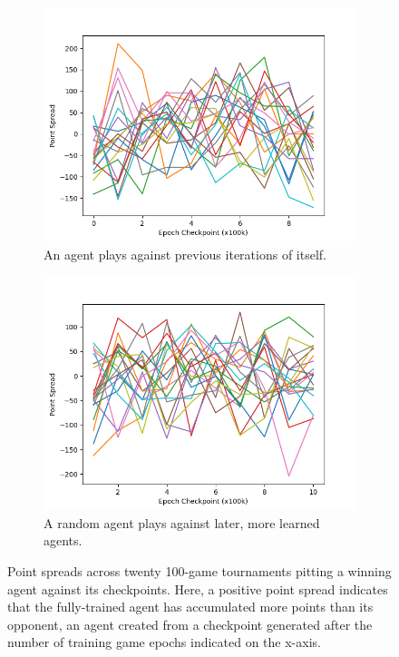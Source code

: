 
\begin{figure}
\center

\begin{subfigure}[b]{0.90\textwidth}
	\includegraphics[width=\linewidth]{images/findings/round1/spreads.png}
	\caption{An agent plays against previous iterations of itself.}
	\label{fig_r1-spreads_a}
\end{subfigure}

\begin{subfigure}[b]{0.90\textwidth}
	\includegraphics[width=\linewidth]{images/findings/round1/random-spreads.png}
	\caption{A random agent plays against later, more learned agents.}
	\label{fig_r1-spreads_b}
\end{subfigure}


\caption{
	Point spreads across twenty 100-game tournaments pitting a winning
	agent against its checkpoints.
	Here, a positive point spread indicates that the fully-trained agent has
	accumulated more points than its opponent,
	an agent created from a checkpoint generated after the number of training
	game epochs indicated on the x-axis.
}
\label{fig_r1-spreads}
\end{figure}
